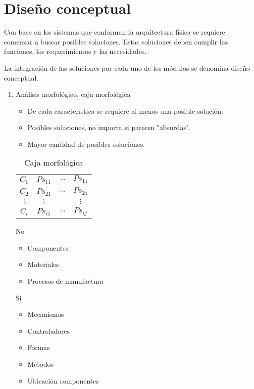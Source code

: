 \section{Diseño conceptual}
Con base en los sistemas que conforman la arquitectura física se requiere comenzar a buscar posibles soluciones. Estas soluciones deben cumplir las funciones, los requerimientos y las necesidades.

La integración de las soluciones por cada uno de los módulos se denomina diseño conceptual.

\begin{enumerate}
    \item Análisis morfológico, caja morfológica
        \begin{itemize}
            \item De cada característica se requiere al menos una posible solución. 
            \item Posibles soluciones, no importa si parecen "absurdas".
            \item Mayor cantidad de posibles soluciones.
        \end{itemize}
        
        \begin{table}[h]
            \centering
            \begin{tabular}{|c|c|c|c|}
                \hline
                \( C_{1} \) & \( Ps_{11} \) & \( \cdots \)& \( Ps_{1j} \) \\
                \( C_{2} \) & \( Ps_{21} \) & \( \cdots \) & \( Ps_{2j} \) \\
                \( \vdots \) & \( \vdots \) & & \( \vdots \) \\
                \( C_{i} \) & \( Ps_{i1} \) & \( \cdots \) & \( Ps_{ij} \) \\
                \hline
            \end{tabular}
            \caption{Caja morfológica}
        \end{table}
        
        No
        \begin{itemize}
            \item Componentes
            \item Materiales
            \item Procesos de manufactura
        \end{itemize}
        
        Si
        \begin{itemize}
            \item Mecanismos 
            \item Controladores
            \item Formas
            \item Métodos
            \item Ubicación componentes 
        \end{itemize}
        

\end{enumerate}

